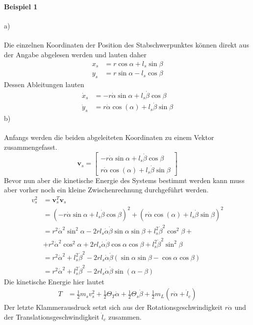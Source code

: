 \textbf{Beispiel 1} \\ \\
a)\\ \\
Die einzelnen Koordinaten der Position des Stabschwerpunktes können direkt aus der Angabe abgelesen werden und lauten daher
\begin{align*}
	x_s &= r\cos\alpha + l_s\sin\beta \\
	y_s &= r\sin\alpha - l_s\cos\beta
\end{align*}
Dessen Ableitungen lauten
\begin{align*}
	\dot{x}_s &= -r\dot{\alpha}\sin\alpha + l_s\dot{\beta}\cos\beta \\
	\dot{y}_s &= r\dot{\alpha}\cos(\alpha) + l_s\dot{\beta}\sin\beta
\end{align*}
b) \\ \\
Anfangs werden die beiden abgeleiteten Koordinaten zu einem Vektor zusammengefasst.
\[
	\textbf{v}_s = \begin{bmatrix}
		-r\dot{\alpha}\sin\alpha + l_s\dot{\beta}\cos\beta \\
		r\dot{\alpha}\cos(\alpha) + l_s\dot{\beta}\sin\beta
	\end{bmatrix}
\]
Bevor nun aber die kinetische Energie des Systems bestimmt werden kann muss aber vorher noch ein kleine Zwischenrechnung durchgeführt werden.
\begin{align*}
	v_s^2 &= \textbf{v}_s^T\textbf{v}_s \\
		  &= (-r\dot{\alpha}\sin\alpha + l_s\dot{\beta}\cos\beta)^2 + (r\dot{\alpha}\cos(\alpha) + l_s\dot{\beta}\sin\beta)^2 \\
		  &= r^2\dot{\alpha}^2\sin^2\alpha - 2rl_s\dot{\alpha}\dot{\beta}\sin\alpha\sin\beta + l_s^2\dot{\beta}^2\cos^2\beta + \\
		  &+ r^2\dot{\alpha}^2\cos^2\alpha + 2rl_s\dot{\alpha}\dot{\beta}\cos\alpha\cos\beta + l_s^2\dot{\beta}^2\sin^2\beta \\
		  &= r^2\dot{\alpha}^2 + l_s^2\dot{\beta}^2 - 2rl_s\dot{\alpha}\dot{\beta}(\sin\alpha\sin\beta - \cos\alpha\cos\beta) \\
		  &= r^2\dot{\alpha}^2 + l_s^2\dot{\beta}^2 - 2rl_s\dot{\alpha}\dot{\beta}\sin(\alpha - \beta)
\end{align*}
Die kinetische Energie hier lautet
\begin{align*}
	T &= \frac{1}{2}m_sv_s^2 + \frac{1}{2}\Theta_T\dot{\alpha} + \frac{1}{2}\Theta_s\dot{\beta} + \frac{1}{2}m_L(r\dot{\alpha} + \dot{l}_c)
\end{align*}
Der letzte Klammerausdruck setzt sich aus der Rotationsgeschwindigkeit $r\dot{\alpha}$ und der Translationsgeschwindigkeit $\dot{l}_c$ zusammen.